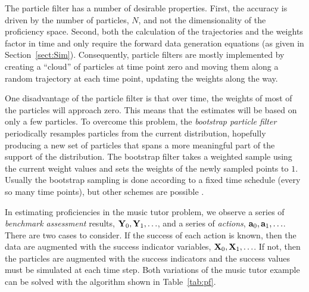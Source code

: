 \documentclass[12pt]{RR-article}
\begin{document}
The particle filter has a number of desirable properties.  First, the
accuracy is driven by the number of particles, $N$, and not the
dimensionality of the proficiency space.  Second, both the calculation
of the trajectories and the weights factor in time and only require
the forward data generation equations (as given in
Section~\ref{sect:Sim}).  Consequently, particle filters are mostly
implemented by creating a ``cloud'' of particles at time point zero
and moving them along a random trajectory at each time point, updating
the weights along the way.

One disadvantage of the particle filter is that over time, the weights
of most of the particles will approach zero.  This means that the
estimates will be based on only a few particles.  To overcome this
problem, the \textit{bootstrap particle filter} periodically resamples
particles from the current distribution, hopefully producing a new set
of particles that spans a more meaningful part of the support of the
distribution.  The bootstrap filter takes a weighted sample using the
current weight values and sets the weights of the newly sampled points
to $1$.  Usually 
the bootstrap sampling is done according to a fixed time schedule
(every so many time points), but other schemes are possible
\cite{Liu2001}.

In estimating proficiencies in the music tutor problem, we observe a
series of \textit{benchmark assessment} results, ${\bf Y}_0, {\bf
Y}_1, \ldots$, and a series of \textit{actions}, ${\bf a}_0, {\bf a}_1,
\ldots$.  There are two cases to consider.  If the success of each
action is known, then the data are augmented with the success indicator
variables, ${\bf X}_0, {\bf X}_1, \ldots$.  If not, then the particles
are augmented with the success indicators and the success values must
be simulated at each time step.  Both variations of the music tutor
example can be solved with the algorithm shown in Table~\ref{tab:pf}.
\end{document}
